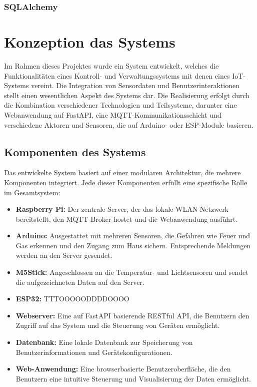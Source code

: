 \documentclass[12pt, letterpaper]{article}
\begin{document}
    \subsubsection{SQLAlchemy}

\newpage
\section{Konzeption das Systems}
\par Im Rahmen dieses Projektes wurde ein System entwickelt, welches die Funktionalitäten eines Kontroll- und Verwaltungssystems mit denen eines IoT-Systems vereint. Die Integration von Sensordaten und Benutzerinteraktionen stellt einen wesentlichen Aspekt des Systems dar. Die Realisierung erfolgt durch die Kombination verschiedener Technologien und Teilsysteme, darunter eine Webanwendung auf FastAPI, eine MQTT-Kommunikationsschicht und verschiedene Aktoren und Sensoren, die auf Arduino- oder ESP-Module basieren.
\subsection{Komponenten des Systems}
\par Das entwickelte System basiert auf einer modularen Architektur, die mehrere Komponenten integriert. Jede dieser Komponenten erfüllt eine spezifische Rolle im Gesamtsystem: 
\begin{itemize} 
  \item \textbf{Raspberry Pi:} Der zentrale Server, der das lokale WLAN-Netzwerk bereitstellt, den MQTT-Broker hostet und die Webanwendung ausführt. 
  \item \textbf{Arduino:} Ausgestattet mit mehreren Sensoren, die Gefahren wie Feuer und Gas erkennen und den Zugang zum Haus sichern. Entsprechende Meldungen werden an den Server gesendet.
  \item \textbf{M5Stick:} Angeschlossen an die Temperatur- und Lichtsensoren und sendet die aufgezeichneten Daten auf den Server. 
  \item \textbf{ESP32:} TTTOOOOODDDDOOOO 
  \item \textbf{Webserver:} Eine auf FastAPI basierende RESTful API, die Benutzern den Zugriff auf das System und die Steuerung von Geräten ermöglicht. 
  \item \textbf{Datenbank:} Eine lokale Datenbank zur Speicherung von Benutzerinformationen und Gerätekonfigurationen.
  \item \textbf{Web-Anwendung:} Eine browserbasierte Benutzeroberfläche, die den Benutzern eine intuitive Steuerung und Visualisierung der Daten ermöglicht. 
\end{itemize}
\end{document}
